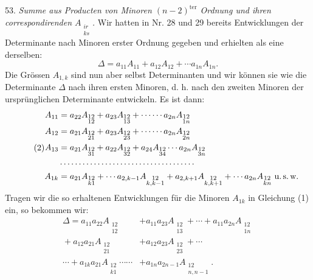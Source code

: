 \documentclass[11pt]{article}
\providecommand{\weq}[2]{\begin{equation}\tag{#1}#2\end{equation}}
\let\Delta\varDelta
\begin{document}
53. \textit{Summe aus Producten von Minoren $(n-2)^{\text{ter}}$ Ordnung und ihren correspondirenden $A_{\substack{ir \\ ks}}$.} Wir hatten in Nr. 28 und 29 bereits Entwicklungen der Determinante nach Minoren erster Ordnung gegeben und erhielten als eine derselben:
\weq{1}{
\Delta = a_{11} A_{11} + a_{12} A_{12} + \cdots a_{1n} A_{1n}.
}
Die Grössen $A_{1,k}$ sind nun aber selbst Determinanten und wir können sie wie die Determinante $\Delta$ nach ihren ersten Minoren, d. h. nach den zweiten Minoren der ursprünglichen Determinante entwickeln. Es ist dann:
\weq{2}{
\begin{aligned}
A_{11} &= a_{22} A_{\substack{12\\12}} + a_{23} A_{\substack{12\\13}} + \cdots\cdots a_{2n} A_{\substack{12\\1n}} \\
A_{12} &= a_{21} A_{\substack{12\\21}} + a_{23} A_{\substack{12\\23}} + \cdots\cdots a_{2n} A_{\substack{12\\2n}} \\
A_{13} &= a_{21} A_{\substack{12\\31}} + a_{22} A_{\substack{12\\32}} + a_{24} A_{\substack{12\\34}} \cdots a_{2n} A_{\substack{12\\3n}} \\
&\cdots\cdots\cdots\cdots\cdots\cdots\cdots\cdots\cdots\cdots\cdots\cdots \\
A_{1k} &= a_{21} A_{\substack{12\\k1}} + \cdots a_{2,k-1} A_{\substack{12\\k,k-1}} + a_{2,k+1} A_{\substack{12\\k,k+1}} + \cdots a_{2n} A_{\substack{12\\kn}} \ \text{u.\,s.\,w.}
\end{aligned}
}
Tragen wir die so erhaltenen Entwicklungen für die Minoren $A_{1k}$ in Gleichung (1) ein, so bekommen wir:
\weq{3}{
\begin{aligned}
\Delta = a_{11} a_{22} A_{\substack{12\\12}} &+ a_{11} a_{23} A_{\substack{12\\13}} + \cdots + a_{11} a_{2n} A_{\substack{12\\1n}} \\
{}+ a_{12} a_{21} A_{\substack{12\\21}} &+ a_{12} a_{23} A_{\substack{12\\23}} + \cdots \\
\cdots + a_{1k} a_{21} A_{\substack{12\\k1}} \cdots\cdots &+ a_{1n} a_{2n-1} A_{\substack{12\\n,n-1}}.
\end{aligned}
}
\end{document}
